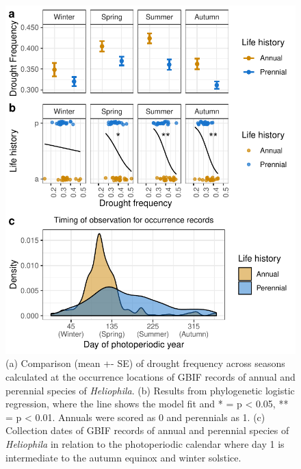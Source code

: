 \documentclass[man,floatsintext]{apa6}
\theoremstyle{definition}
\theoremstyle{definition}
\theoremstyle{definition}
\theoremstyle{remark}
\begin{document}
\begin{figure}[!h]
\includegraphics[width=\textwidth]{../figures/line_and_dates} \caption{(a) Comparison (mean +- SE) of drought frequency across
seasons calculated at the occurrence locations of GBIF records of annual
and perennial species of \emph{Heliophila}. (b) Results from
phylogenetic logistic regression, where the line shows the model fit and
* = p \textless{} 0.05, ** = p \textless{} 0.01. Annuals were scored as
0 and perennials as 1. (c) Collection dates of GBIF records of annual
and perennial species of \emph{Heliophila} in relation to the
photoperiodic calendar where day 1 is intermediate to the autumn equinox
and winter solstice.}\label{fig:lineplots}
\end{figure}
\end{document}
